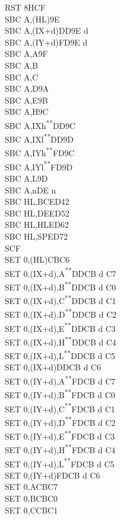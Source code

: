 \documentclass[twoside,openright,a4paper]{book}
\newcommand{\UNDOC}{\textnormal{\textsuperscript{**}}}
\begin{document}
\begin{multicols}{3}
{\begin{tabbing}
	RST 8H\>CF\\
	SBC A,(HL)\>9E\\
	SBC A,(IX+d)\>DD9E d\\
	SBC A,(IY+d)\>FD9E d\\
	SBC A,A\>9F\\
	SBC A,B\\
	SBC A,C\\
	SBC A,D\>9A\\
	SBC A,E\>9B\\
	SBC A,H\>9C\\
	SBC A,IXh\UNDOC\>DD9C\\
	SBC A,IXl\UNDOC\>DD9D\\
	SBC A,IYh\UNDOC\>FD9C\\
	SBC A,IYl\UNDOC\>FD9D\\
	SBC A,L\>9D\\
	SBC A,n\>DE n\\
	SBC HL,BC\>ED42\\
	SBC HL,DE\>ED52\\
	SBC HL,HL\>ED62\\
	SBC HL,SP\>ED72\\
	SCF\\
	SET 0,(HL)\>CBC6\\
	SET 0,(IX+d),A\UNDOC\>DDCB d C7\\
	SET 0,(IX+d),B\UNDOC\>DDCB d C0\\
	SET 0,(IX+d),C\UNDOC\>DDCB d C1\\
	SET 0,(IX+d),D\UNDOC\>DDCB d C2\\
	SET 0,(IX+d),E\UNDOC\>DDCB d C3\\
	SET 0,(IX+d),H\UNDOC\>DDCB d C4\\
	SET 0,(IX+d),L\UNDOC\>DDCB d C5\\
	SET 0,(IX+d)\>DDCB d C6\\
	SET 0,(IY+d),A\UNDOC\>FDCB d C7\\
	SET 0,(IY+d),B\UNDOC\>FDCB d C0\\
	SET 0,(IY+d),C\UNDOC\>FDCB d C1\\
	SET 0,(IY+d),D\UNDOC\>FDCB d C2\\
	SET 0,(IY+d),E\UNDOC\>FDCB d C3\\
	SET 0,(IY+d),H\UNDOC\>FDCB d C4\\
	SET 0,(IY+d),L\UNDOC\>FDCB d C5\\
	SET 0,(IY+d)\>FDCB d C6\\
	SET 0,A\>CBC7\\
	SET 0,B\>CBC0\\
	SET 0,C\>CBC1\\

\end{tabbing}}
\end{multicols}
\end{document}
